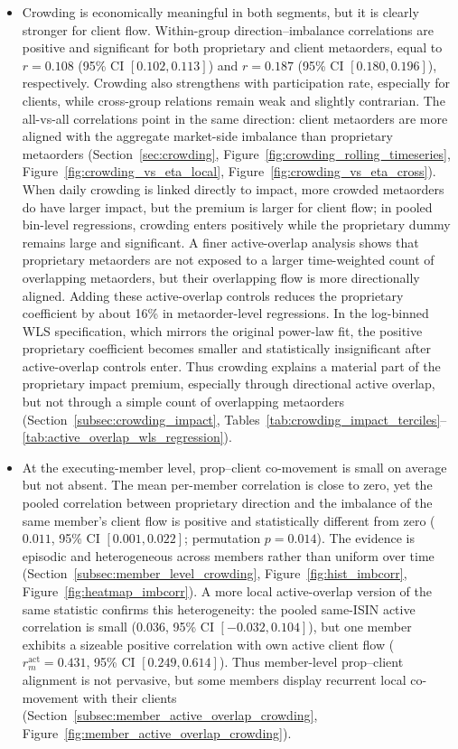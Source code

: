 \documentclass[11pt]{article}
\begin{document}
\begin{itemize}
  \item Crowding is economically meaningful in both segments, but it is clearly stronger for client flow. Within-group
  direction--imbalance correlations are positive and significant for both proprietary and client metaorders, equal to
  $r=0.108$ (95\% CI $[0.102,0.113]$) and $r=0.187$ (95\% CI $[0.180,0.196]$), respectively. Crowding also strengthens with
  participation rate, especially for clients, while cross-group relations remain weak and slightly contrarian. The all-vs-all
  correlations point in the same direction: client metaorders are more aligned with the aggregate market-side imbalance than
  proprietary metaorders (Section~\ref{sec:crowding}, Figure~\ref{fig:crowding_rolling_timeseries},
  Figure~\ref{fig:crowding_vs_eta_local}, Figure~\ref{fig:crowding_vs_eta_cross}).
  When daily crowding is linked directly to impact, more crowded metaorders do have larger impact, but the premium is larger for
  client flow; in pooled bin-level regressions, crowding enters positively while the proprietary dummy remains large and
  significant. A finer active-overlap analysis shows that proprietary metaorders are not exposed to a larger
  time-weighted count of overlapping metaorders, but their overlapping flow is more directionally aligned. Adding these active-overlap
  controls reduces the proprietary coefficient by about 16\% in metaorder-level regressions. In the log-binned WLS specification,
  which mirrors the original power-law fit, the positive proprietary coefficient becomes smaller and statistically insignificant after
  active-overlap controls enter.
  Thus crowding explains a material part of the proprietary impact premium, especially through directional active overlap, but not
  through a simple count of overlapping metaorders
  (Section~\ref{subsec:crowding_impact}, Tables~\ref{tab:crowding_impact_terciles}--\ref{tab:active_overlap_wls_regression}).

  \item At the executing-member level, prop--client co-movement is small on average but not absent. The mean per-member
  correlation is close to zero, yet the pooled correlation between proprietary direction and the imbalance of the same member's
  client flow is positive and statistically different from zero ($0.011$, 95\% CI $[0.001,0.022]$; permutation $p=0.014$). The
  evidence is episodic and heterogeneous across members rather than uniform over time (Section~\ref{subsec:member_level_crowding},
  Figure~\ref{fig:hist_imbcorr}, Figure~\ref{fig:heatmap_imbcorr}). A more local active-overlap version of the same statistic
  confirms this heterogeneity: the pooled same-ISIN active correlation is small ($0.036$, 95\% CI $[-0.032,0.104]$), but one
  member exhibits a sizeable positive correlation with own active client flow ($r_m^{\mathrm{act}}=0.431$, 95\% CI
  $[0.249,0.614]$). Thus member-level prop--client alignment is not pervasive, but some members display recurrent local
  co-movement with their clients (Section~\ref{subsec:member_active_overlap_crowding},
  Figure~\ref{fig:member_active_overlap_crowding}).
\end{itemize}
\end{document}
